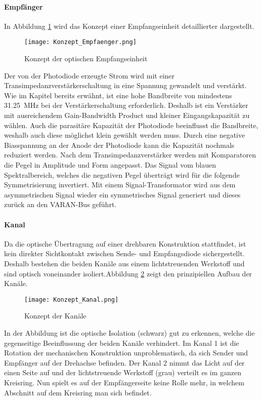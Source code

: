 \paragraph{Empfänger}
In Abbildung \ref{fig:Konzept_Empfaenger} wird das Konzept einer Empfangseinheit detaillierter dargestellt.

\begin{figure}[h]
	\centering
	\texttt{[image: Konzept\_Empfaenger.png]}
	\caption{Konzept der optischen Empfangseinheit}\label{fig:Konzept_Empfaenger}
\end{figure}

Der von der Photodiode erzeugte Strom wird mit einer Transimpedanzverstärkerschaltung in eine Spannung gewandelt und verstärkt. Wie im Kapitel  bereits erwähnt, ist eine hohe Bandbreite von mindestens \SI{31.25}{MHz} bei der Verstärkerschaltung erforderlich. Deshalb ist ein Verstärker mit ausreichendem Gain-Bandwidth Product und kleiner Eingangskapazität zu wählen. Auch die parasitäre Kapazität der Photodiode beeinflusst die Bandbreite, weshalb auch diese möglichst klein gewählt werden muss. Durch eine negative Biasspannung an der Anode der Photodiode kann die Kapazität nochmals reduziert werden.
\newline
Nach dem Transimpedanzverstärker werden mit Komparatoren die Pegel in Amplitude und Form angepasst. Das Signal vom blauen Spektralbereich, welches die negativen Pegel überträgt wird für die folgende Symmetrisierung invertiert. Mit einem Signal-Transformator wird aus dem asymmetrischen Signal wieder ein symmetrisches Signal generiert und dieses zurück an den VARAN-Bus geführt.

\paragraph{Kanal}
Da die optische Übertragung auf einer drehbaren Konstruktion stattfindet, ist kein direkter Sichtkontakt zwischen Sende- und Empfangsdiode sichergestellt. Deshalb bestehen die beiden Kanäle aus einem lichtstreuenden Werkstoff und sind optisch voneinander isoliert.Abbildung \ref{fig:Konzept_Kanal} zeigt den prinzipiellen Aufbau der Kanäle.

\begin{figure}[h]
	\centering
	\texttt{[image: Konzept\_Kanal.png]}
	\caption{Konzept der Kanäle}\label{fig:Konzept_Kanal}
\end{figure}

In der Abbildung ist die optische Isolation (schwarz) gut zu erkennen, welche die gegenseitige Beeinflussung der beiden Kanäle verhindert. Im Kanal 1 ist die Rotation der mechanischen Konstruktion unproblematisch, da sich Sender und Empfänger auf der Drehachse befinden. Der Kanal 2 nimmt das Licht auf der einen Seite auf und der lichtstreuende Werkstoff (grau) verteilt es im ganzen Kreisring. Nun spielt es auf der Empfängerseite keine Rolle mehr, in welchem Abschnitt auf dem Kreisring man sich befindet.

